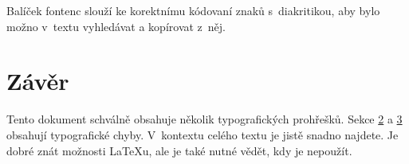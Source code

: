 \documentclass[a4paper, 10pt, twocolumn]{article}
\begin{document}
Balíček fontenc slouží ke korektnímu kódovaní znaků s~diakritikou, aby bylo možno v~textu vyhledávat a kopírovat z~něj.


\section{Závěr}

Tento dokument schválně obsahuje několik typografických prohřešků.
Sekce \hyperref[sec:2]{2} a \hyperref[sec:3]{3} obsahují typografické chyby.
V~kontextu celého textu je jistě snadno najdete.
Je dobré znát možnosti \LaTeX u, ale je také nutné vědět, kdy je nepoužít.
\end{document}
